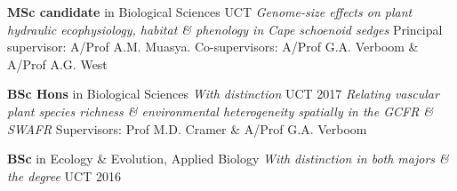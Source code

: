 \begin{hangparas}{2em}{1}

\textbf{MSc candidate} in Biological Sciences \hfill {\small UCT} \break %
\textit{Genome-size effects on plant hydraulic ecophysiology, habitat \&
  phenology in Cape schoenoid sedges} \break
Principal supervisor: A/Prof A.M. Muasya. Co-supervisors: A/Prof G.A. Verboom
  \& A/Prof A.G. West

\textbf{BSc Hons} in Biological Sciences {\small \textit{With distinction}}
                                                 \hfill {\small UCT 2017} \break
\textit{Relating vascular plant species richness \& environmental heterogeneity
  spatially in the GCFR \& SWAFR} \break
Supervisors: Prof M.D. Cramer \& A/Prof G.A. Verboom

\textbf{BSc} in Ecology \& Evolution, Applied Biology {\small \textit{With
  distinction in both majors \& the degree}}            \hfill {\small UCT 2016}

\end{hangparas}
